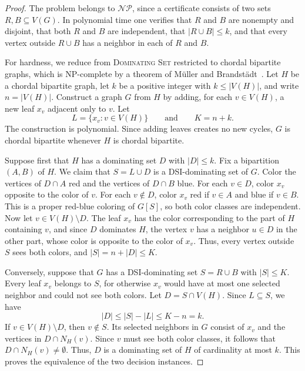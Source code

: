 \documentclass[11pt]{article}
\theoremstyle{definition}
\theoremstyle{remark}
\begin{document}
\begin{proof}
The problem belongs to \(\mathcal{NP}\), since a certificate consists of two
sets \(R,B\subseteq V(G)\). In polynomial time one verifies that \(R\) and
\(B\) are nonempty and disjoint, that both \(R\) and \(B\) are independent,
that \(|R\cup B|\le k\), and that every vertex outside \(R\cup B\) has a
neighbor in each of \(R\) and \(B\).

For hardness, we reduce from \textsc{Dominating Set} restricted to chordal
bipartite graphs, which is NP-complete by a theorem of M\"uller and
Brandst\"adt~\cite{MullerBrandstadt87}. Let \(H\) be a chordal bipartite
graph, let \(k\) be a positive integer with \(k\le |V(H)|\), and write
\(n=|V(H)|\). Construct a graph \(G\) from \(H\) by adding, for each
\(v\in V(H)\), a new leaf \(x_v\) adjacent only to \(v\). Let
\[
   L=\{x_v: v\in V(H)\}
   \qquad\text{and}\qquad
   K=n+k.
\]
The construction is polynomial. Since adding leaves creates no new cycles,
\(G\) is chordal bipartite whenever \(H\) is chordal bipartite.

Suppose first that \(H\) has a dominating set \(D\) with \(|D|\le k\). Fix a
bipartition \((A,B)\) of \(H\). We claim that \(S=L\cup D\) is a
DSI-dominating set of \(G\). Color the vertices of \(D\cap A\) red and the
vertices of \(D\cap B\) blue. For each \(v\in D\), color \(x_v\) opposite to
the color of \(v\). For each \(v\notin D\), color \(x_v\) red if \(v\in A\)
and blue if \(v\in B\). This is a proper red-blue coloring of \(G[S]\), so
both color classes are independent. Now let \(v\in V(H)\setminus D\). The
leaf \(x_v\) has the color corresponding to the part of \(H\) containing
\(v\), and since \(D\) dominates \(H\), the vertex \(v\) has a neighbor
\(u\in D\) in the other part, whose color is opposite to the color of
\(x_v\). Thus, every vertex outside \(S\) sees both colors, and
\(|S|=n+|D|\le K\).

Conversely, suppose that \(G\) has a DSI-dominating set \(S=R\cup B\) with
\(|S|\le K\). Every leaf \(x_v\) belongs to \(S\), for otherwise \(x_v\)
would have at most one selected neighbor and could not see both colors. Let
\(D=S\cap V(H)\). Since \(L\subseteq S\), we have
\[
   |D|\le |S|-|L|\le K-n=k.
\]
If \(v\in V(H)\setminus D\), then \(v\notin S\). Its selected neighbors in
\(G\) consist of \(x_v\) and the vertices in \(D\cap N_H(v)\). Since \(v\)
must see both color classes, it follows that \(D\cap N_H(v)\neq\emptyset\).
Thus, \(D\) is a dominating set of \(H\) of cardinality at most \(k\). This
proves the equivalence of the two decision instances.
\end{proof}
\end{document}
